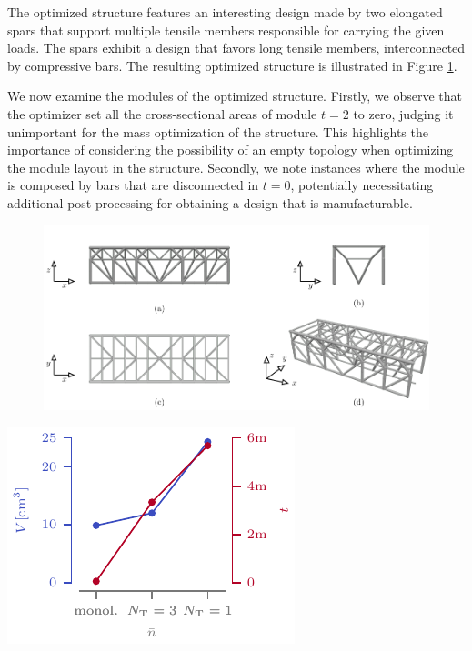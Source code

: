 The optimized structure features an interesting design made by two elongated spars that support multiple tensile members responsible for carrying the given loads. The spars exhibit a design that favors long tensile members, interconnected by compressive bars. The resulting optimized structure is illustrated in Figure \ref{fig:05_multiple_topology_sol}.

We now examine the modules of the optimized structure. Firstly, we observe that the optimizer set all the cross-sectional areas of module $t=2$ to zero, judging it unimportant for the mass optimization of the structure. This highlights the importance of considering the possibility of an empty topology when optimizing the module layout in the structure. Secondly, we note instances where the module is composed by bars that are disconnected \eg in $t=0$, potentially necessitating additional post-processing for obtaining a design that is manufacturable.

\begin{figure}
    \centering
    \includegraphics{figures/05_cellular_opt/00_multiple_topology/support_sol.pdf}
    \caption{}
    \label{fig:05_multiple_topology_sol}
\end{figure}

\begin{marginfigure}
    \centering
    \includegraphics[width=\linewidth]{figures/05_cellular_opt/00_multiple_tab/multi_tab.pdf}
    \caption{}
    \label{fig:05_multiple_topology_sol_graph}
\end{marginfigure}

